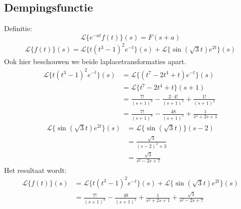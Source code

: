 \subsection{Dempingsfunctie}
Definitie:
$$\mathcal{L}\{e^{-at}f(t)\}(s) = F(s + a)$$
{
\begin{equation*}
\begin{split}
\mathcal{L}\{f(t)\}(s) = \mathcal{L}\{t(t^3 - 1)^2e^{-t}\}(s) + \mathcal{L}\{\sin(\sqrt{3}t)e^{2t}\}(s)
\end{split}
\end{equation*}
Ook hier beschouwen we beide laplacetransformaties apart.
\begin{equation*}
\begin{split}
\mathcal{L}\{t(t^3 - 1)^2e^{-t}\}(s) & = \mathcal{L}\{(t^7 - 2t^4 + t)e^{-t}\}(s) \\
                                    & = \mathcal{L}\{t^7 - 2t^4 + t\}(s + 1) \\
                                    & = \frac{7!}{(s + 1)^8} - \frac{2 \cdot 4!}{(s + 1)^5} + \frac{1!}{(s + 1)^2} \\
                                    & = \frac{7!}{(s + 1)^8} - \frac{48}{(s + 1)^5} + \frac{1}{s^2 + 2s + 1}
\end{split}
\end{equation*}
\begin{equation*}
\begin{split}
\mathcal{L}\{\sin(\sqrt{3}t)e^{2t}\}(s) & = \mathcal{L}\{\sin(\sqrt{3}t)\}(s - 2) \\
                                        & = \frac{\sqrt{3}}{(s - 2)^2 + 3} \\
                                        & = \frac{\sqrt{3}}{s^2 -2s + 7}
\end{split}
\end{equation*}
Het resultaat wordt:
\begin{equation*}
\begin{split}
\mathcal{L}\{f(t)\}(s) & = \mathcal{L}\{t(t^3 - 1)^2e^{-t}\}(s) + \mathcal{L}\{\sin(\sqrt{3}t)e^{2t}\}(s) \\
                        & = \frac{7!}{(s + 1)^8} - \frac{48}{(s + 1)^5} + \frac{1}{s^2 + 2s + 1} + \frac{\sqrt{3}}{s^2 -2s + 7}
\end{split}
\end{equation*}
}
